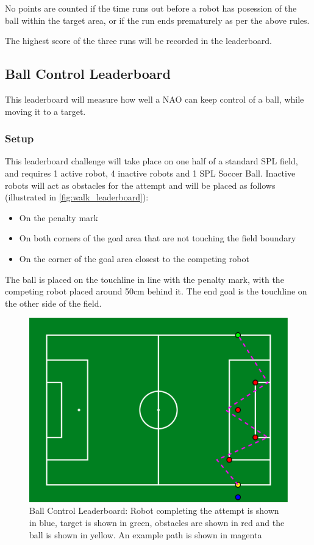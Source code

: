No points are counted if the time runs out before a robot has posession of the ball
within the target area, or if the run ends prematurely as per the above rules.

The highest score of the three runs will be recorded in the leaderboard.

\subsection{Ball Control Leaderboard}
This leaderboard will measure how well a NAO can keep control of a ball, while moving it
to a target.

\subsubsection{Setup}
This leaderboard challenge will take place on one half of a standard SPL field, and requires 1 active robot, 4 inactive robots and 1 SPL Soccer Ball.
Inactive robots will act as obstacles for the attempt and will be placed as follows (illustrated in \cref{fig:walk_leaderboard}):
\begin{itemize}
    \item On the penalty mark
    \item On both corners of the goal area that are not touching the field boundary
    \item On the corner of the goal area closest to the competing robot
\end{itemize}
The ball is placed on the touchline in line with the penalty mark, with the competing
robot placed around 50cm behind it.
The end goal is the touchline on the other side of the field.

\begin{figure}[t]
    \centerline{\includegraphics[width=\columnwidth]{figs/control_leaderboard.pdf}}
    \caption{Ball Control Leaderboard: Robot completing the attempt is shown in blue, target is shown in green, obstacles are shown in red and the ball is shown in yellow. An example path is shown in magenta}
    \label{fig:ball_control_leaderboard}
\end{figure}

